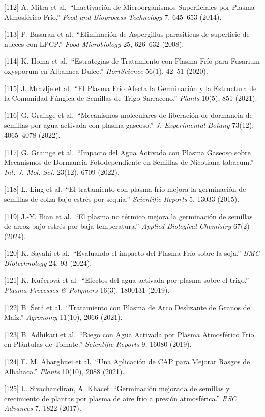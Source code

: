 \documentclass[
]{article}
\begin{document}
{[}112{]} A. Mitra et al.~``Inactivación de Microorganismos
Superficiales por Plasma Atmosférico Frío.'' \emph{Food and Bioprocess
Technology} 7, 645--653 (2014).

{[}113{]} P. Basaran et al.~``Eliminación de Aspergillus parasiticus de
superficie de nueces con LPCP.'' \emph{Food Microbiology} 25, 626--632
(2008).

{[}114{]} K. Homa et al.~``Estrategias de Tratamiento con Plasma Frío
para Fusarium oxysporum en Albahaca Dulce.'' \emph{HortScience} 56(1),
42--51 (2020).

{[}115{]} J. Mravlje et al.~``El Plasma Frío Afecta la Germinación y la
Estructura de la Comunidad Fúngica de Semillas de Trigo Sarraceno.''
\emph{Plants} 10(5), 851 (2021).

{[}116{]} G. Grainge et al.~``Mecanismos moleculares de liberación de
dormancia de semillas por agua activada con plasma gaseoso.'' \emph{J.
Experimental Botany} 73(12), 4065--4078 (2022).

{[}117{]} G. Grainge et al.~``Impacto del Agua Activada con Plasma
Gaseoso sobre Mecanismos de Dormancia Fotodependiente en Semillas de
Nicotiana tabacum.'' \emph{Int. J. Mol. Sci.} 23(12), 6709 (2022).

{[}118{]} L. Ling et al.~``El tratamiento con plasma frío mejora la
germinación de semillas de colza bajo estrés por sequía.''
\emph{Scientific Reports} 5, 13033 (2015).

{[}119{]} J.-Y. Bian et al.~``El plasma no térmico mejora la germinación
de semillas de arroz bajo estrés por baja temperatura.'' \emph{Applied
Biological Chemistry} 67(2) (2024).

{[}120{]} K. Sayahi et al.~``Evaluando el impacto del Plasma Frío sobre
la soja.'' \emph{BMC Biotechnology} 24, 93 (2024).

{[}121{]} K. Kučerová et al.~``Efectos del agua activada por plasma
sobre el trigo.'' \emph{Plasma Processes \& Polymers} 16(3), 1800131
(2019).

{[}122{]} B. Šerá et al.~``Tratamiento con Plasma de Arco Deslizante de
Granos de Maíz.'' \emph{Agronomy} 11(10), 2066 (2021).

{[}123{]} B. Adhikari et al.~``Riego con Agua Activada por Plasma
Atmosférico Frío en Plántulas de Tomate.'' \emph{Scientific Reports} 9,
16080 (2019).

{[}124{]} F. M. Abarghuei et al.~``Una Aplicación de CAP para Mejorar
Rasgos de Albahaca.'' \emph{Plants} 10(10), 2088 (2021).

{[}125{]} L. Sivachandiran, A. Khacef. ``Germinación mejorada de
semillas y crecimiento de plantas por plasma de aire frío a presión
atmosférica.'' \emph{RSC Advances} 7, 1822 (2017).
\end{document}
